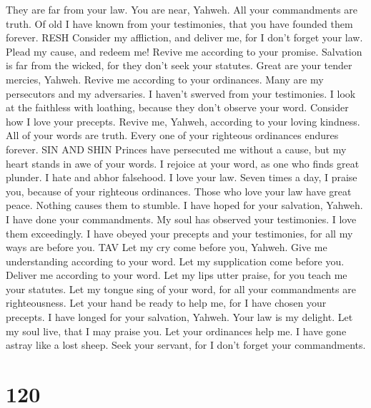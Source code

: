 They are far from your law.  You are near, Yahweh. All
your commandments are truth.  Of old I have known from
your testimonies, that you have founded them forever. RESH
 Consider my affliction, and deliver me, for I don't
forget your law.  Plead my cause, and redeem me! Revive me
according to your promise.  Salvation is far from the
wicked, for they don't seek your statutes.  Great are your
tender mercies, Yahweh. Revive me according to your ordinances.
 Many are my persecutors and my adversaries. I haven't
swerved from your testimonies.  I look at the faithless
with loathing, because they don't observe your word. 
Consider how I love your precepts. Revive me, Yahweh, according to your
loving kindness.  All of your words are truth. Every one
of your righteous ordinances endures forever. SIN AND SHIN
 Princes have persecuted me without a cause, but my heart
stands in awe of your words.  I rejoice at your word, as
one who finds great plunder.  I hate and abhor falsehood.
I love your law.  Seven times a day, I praise you, because
of your righteous ordinances.  Those who love your law
have great peace. Nothing causes them to stumble.  I have
hoped for your salvation, Yahweh. I have done your commandments.
 My soul has observed your testimonies. I love them
exceedingly.  I have obeyed your precepts and your
testimonies, for all my ways are before you. TAV  Let my
cry come before you, Yahweh. Give me understanding according to your
word.  Let my supplication come before you. Deliver me
according to your word.  Let my lips utter praise, for you
teach me your statutes.  Let my tongue sing of your word,
for all your commandments are righteousness.  Let your
hand be ready to help me, for I have chosen your precepts.
 I have longed for your salvation, Yahweh. Your law is my
delight.  Let my soul live, that I may praise you. Let
your ordinances help me.  I have gone astray like a lost
sheep. Seek your servant, for I don't forget your commandments.

\hypertarget{section-110}{%
\section{120}\label{section-110}}

